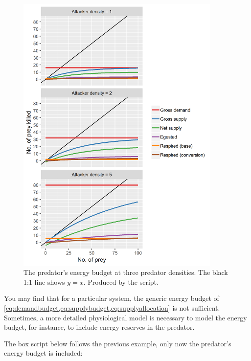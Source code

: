 \begin{figure} [hb]
\centering
\includegraphics[width=0.9\textwidth]{graphics/func-resp-energy-budget}
\caption{ The predator's energy budget at three predator densities. The black 1:1 line shows $y=x$. Produced by the  script.}
\label{fig:func-resp-energy-budget}
\end{figure}

You may find that for a particular system, the generic energy budget of \cref{eq:demandbudget,eq:supplybudget,eq:supplyallocation} is not sufficient. Sometimes, a more detailed physiological model is necessary to model the energy budget, for instance, to include energy reserves in the predator.

The box script below follows the previous example, only now the predator's energy budget is included:

